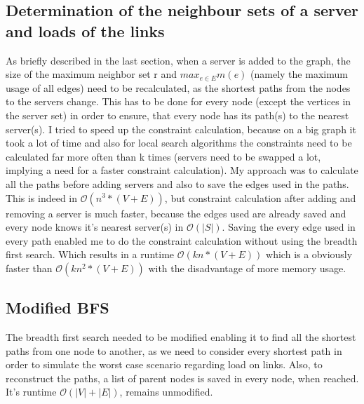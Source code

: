 \documentclass [12pt]{article}
\begin{document}
\subsection{Determination of the neighbour sets of a server and loads of the links}
As briefly described in the last section, when a server is added to the graph, the size of the maximum neighbor set r and
$ max_{e \in E}m(e)$ (namely the maximum usage of all edges) need to be recalculated, as the shortest paths from the nodes 
to the servers change. This has to be done for every node (except the vertices in the server set) in order to ensure, that 
every node has its path(s) to the nearest server(s). I tried to speed up the constraint calculation, 
because on a big graph it took a lot of time and also for local search algorithms the constraints need to be calculated
far more often than k times (servers need to be swapped a lot, implying a need for a faster constraint calculation).
My approach was to calculate all the paths before adding servers and also to save the edges used in the paths.
This is indeed in $\mathcal O(n^{3}*(V+E))$, but constraint calculation after adding and removing a server is much faster,
because the edges used are already saved and every node knows it's nearest server(s) in $\mathcal O(|S|)$. Saving the 
every edge used in every path enabled me to do the constraint calculation without using the breadth first search. Which results
in a runtime $\mathcal O(kn*(V+E))$ which is a obviously faster than $\mathcal O(kn^{2}*(V+E))$ with the disadvantage of more memory usage.

\subsection{Modified BFS}
The breadth first search needed to be modified enabling it to find all the shortest paths 
from one node to another, as we need to consider every shortest path in order to simulate
the worst case scenario regarding load on links. Also, to reconstruct the paths, a list of parent nodes is saved
in every node, when reached.
It's runtime $\mathcal O(|V| + |E|)$, remains unmodified.
\end{document}
